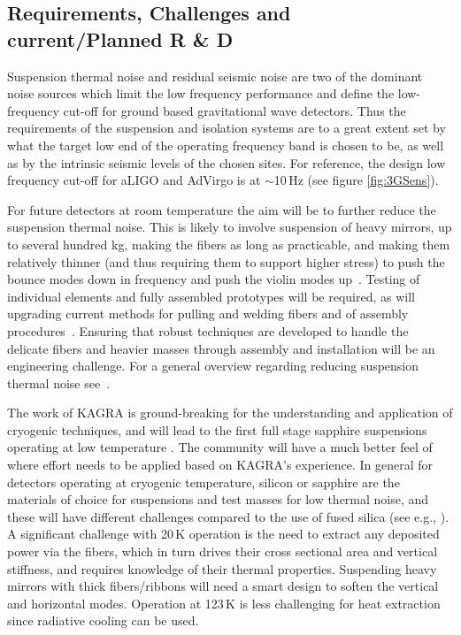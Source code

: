 \begin{samepage}
\section{Requirements, Challenges and current/Planned R \& D}
Suspension thermal noise and residual seismic noise are two of the dominant noise sources which limit the low frequency performance and define the low-frequency cut-off for ground based gravitational wave detectors. Thus the requirements of the suspension and isolation systems are to a great extent set by what the target low end of the operating frequency band is chosen to be, as well as by the intrinsic seismic levels of the chosen sites.
For reference, the design low frequency cut-off for aLIGO and AdVirgo is at $\sim$10\,Hz (see figure \ref{fig:3GSens}).

\end{samepage} %


 For future detectors at room temperature the aim will be to further reduce the suspension thermal noise. This is likely to involve suspension of heavy mirrors, up to several hundred kg, making the fibers as long as practicable, and making them relatively thinner (and thus requiring them to support higher stress) to push the bounce modes down in frequency and push the violin modes up~\cite{Heptonstall:2014, Bell:2014,aisa:2016advanced, Tokmakov:2012, Amico:2002_monolithic}.  Testing of individual elements and fully assembled prototypes will be required, as will upgrading current methods for pulling and welding fibers and of assembly procedures~\cite{Hammond:2014,Travasso:2018}. Ensuring that robust techniques are developed to handle the delicate fibers and heavier masses through assembly and installation will be an engineering challenge. For a general overview regarding reducing suspension thermal noise see~\cite{Hammond:2014, Hammond:2012}.

The work of KAGRA is ground-breaking for the understanding and application of cryogenic techniques, and will lead to the first full stage sapphire suspensions operating at low temperature \cite{Kumar:2016_KAGRA}. The community will have a much better feel of where effort needs to be applied based on KAGRA's experience.
In general for detectors operating at cryogenic temperature, silicon or sapphire are the materials of choice for suspensions and test masses for low thermal noise, and these will have different challenges compared to the use of fused silica (see e.g., \cite{Cumming:2014Silicon, nawrodt:2013,Haughian:2016, Alshourbagy:2006_thermoelastic, Alshourbagy:2006,amico:2004, Cumming:2014Silicon, Alshourbagy:2005}). A significant challenge with 20\,K operation is the need to extract any deposited power via the fibers, which in turn drives their cross sectional area and vertical stiffness, and requires knowledge of their thermal properties. Suspending heavy mirrors with thick fibers/ribbons will need a smart design to soften the vertical and horizontal modes. Operation at 123\,K is less challenging for heat extraction since radiative cooling can be used.

